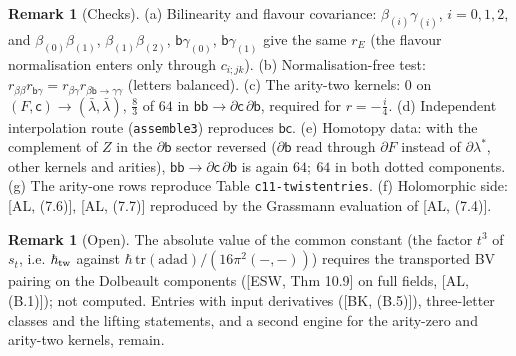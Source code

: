 \documentclass[11pt]{article}
\theoremstyle{definition}
\newtheorem{remark}[theorem]{Remark}
\newcommand{\ad}{\mathrm{ad}}
\begin{document}
\begin{remark}[Checks]
(a) Bilinearity and flavour covariance: $\beta_{(i)}\gamma_{(i)}$, $i=0,1,2$, and $\beta_{(0)}\beta_{(1)}$, $\beta_{(1)}\beta_{(2)}$, $\mathsf b\gamma_{(0)}$, $\mathsf b\gamma_{(1)}$ give the same $r_E$ (the flavour normalisation enters only through $c_{i;jk}$). (b) Normalisation-free test: $r_{\beta\beta}r_{\mathsf b\gamma}=r_{\beta\gamma}r_{\beta\mathsf b\to\gamma\gamma}$ (letters balanced). (c) The arity-two kernels: $0$ on $(F,\mathsf c)\to(\bar\lambda,\bar\lambda)$, $\tfrac83$ of $64$ in $\mathsf b\mathsf b\to\partial\mathsf c\,\partial\mathsf b$, required for $r=-\tfrac i4$. (d) Independent interpolation route (\texttt{assemble3}) reproduces $\mathsf b\mathsf c$. (e) Homotopy data: with the complement of $Z$ in the $\partial\mathsf b$ sector reversed ($\partial\mathsf b$ read through $\partial F$ instead of $\partial\lambda^*$, other kernels and arities), $\mathsf b\mathsf b\to\partial\mathsf c\,\partial\mathsf b$ is again $64;\ 64$ in both dotted components. (g) The arity-one rows reproduce Table \texttt{c11-twistentries}. (f) Holomorphic side: [AL, (7.6)], [AL, (7.7)] reproduced by the Grassmann evaluation of [AL, (7.4)].
\end{remark}

\begin{remark}[Open]
The absolute value of the common constant (the factor $t^3$ of $s_t$, i.e. $\hbar_{\rm tw}$ against $\hbar\,\mathrm{tr}(\ad\ad)/(16\pi^2(-,-))$) requires the transported BV pairing on the Dolbeault components ([ESW, Thm 10.9] on full fields, [AL, (B.1)]); not computed. Entries with input derivatives ([BK, (B.5)]), three-letter classes and the lifting statements, and a second engine for the arity-zero and arity-two kernels, remain.
\end{remark}
\end{document}
